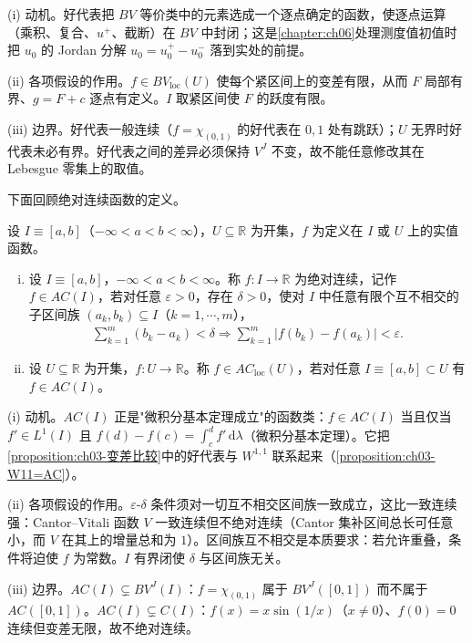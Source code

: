 \documentclass[../../main.tex]{subfiles}%
\begin{document}
\begin{remark}\label{remark:ch03-好代表动机}
(i) 动机。好代表把 $BV$ 等价类中的元素选成一个逐点确定的函数，使逐点运算（乘积、复合、$u^+$、截断）在 $BV$ 中封闭；这是\cref{chapter:ch06}处理测度值初值时把 $u_0$ 的 Jordan 分解 $u_0=u_0^+-u_0^-$ 落到实处的前提。

(ii) 各项假设的作用。$f\in BV_{\mathrm{loc}}(U)$ 使每个紧区间上的变差有限，从而 $F$ 局部有界、$g=F+c$ 逐点有定义。$I$ 取紧区间使 $F$ 的跃度有限。

(iii) 边界。好代表一般连续（$f=\chi_{(0,1)}$ 的好代表在 $0,1$ 处有跳跃）；$U$ 无界时好代表未必有界。好代表之间的差异必须保持 $V^J$ 不变，故不能任意修改其在 Lebesgue 零集上的取值。
\end{remark}

下面回顾绝对连续函数的定义。

\begin{definition}\label{definition:ch03-绝对连续}
设 $I\equiv[a,b]$（$-\infty<a<b<\infty$），$U\subseteq\mathbb{R}$ 为开集，$f$ 为定义在 $I$ 或 $U$ 上的实值函数。
\begin{enumerate}[(i)]
\item 设 $I\equiv[a,b]$，$-\infty<a<b<\infty$。称 $f:I\to\mathbb{R}$ 为绝对连续，记作 $f\in AC(I)$，若对任意 $\varepsilon>0$，存在 $\delta>0$，使对 $I$ 中任意有限个互不相交的子区间族 $(a_k,b_k)\subseteq I$（$k=1,\cdots ,m$），
\begin{align*}
\sum_{k=1}^m(b_k-a_k)<\delta\Rightarrow\sum_{k=1}^m|f(b_k)-f(a_k)|<\varepsilon.
\end{align*}
\item 设 $U\subseteq\mathbb{R}$ 为开集，$f:U\to\mathbb{R}$。称 $f\in AC_{\mathrm{loc}}(U)$，若对任意 $I\equiv[a,b]\subset U$ 有 $f\in AC(I)$。
\end{enumerate}
\end{definition}

\begin{remark}\label{remark:ch03-绝对连续动机}
(i) 动机。$AC(I)$ 正是"微积分基本定理成立"的函数类：$f\in AC(I)$ 当且仅当 $f'\in L^1(I)$ 且 $f(d)-f(c)=\int_c^df'\,\mathrm{d}\lambda$（微积分基本定理）。它把\cref{proposition:ch03-变差比较}中的好代表与 $W^{1,1}$ 联系起来（\cref{proposition:ch03-W11=AC}）。

(ii) 各项假设的作用。$\varepsilon$-$\delta$ 条件须对一切互不相交区间族一致成立，这比一致连续强：Cantor--Vitali 函数 $V$ 一致连续但不绝对连续（Cantor 集补区间总长可任意小，而 $V$ 在其上的增量总和为 $1$）。区间族互不相交是本质要求：若允许重叠，条件将迫使 $f$ 为常数。$I$ 有界闭使 $\delta$ 与区间族无关。

(iii) 边界。$AC(I)\subsetneq BV^J(I)$：$f=\chi_{(0,1)}$ 属于 $BV^J([0,1])$ 而不属于 $AC([0,1])$。$AC(I)\subsetneq C(I)$：$f(x)=x\sin(1/x)$（$x\neq0$）、$f(0)=0$ 连续但变差无限，故不绝对连续。
\end{remark}
\end{document}
